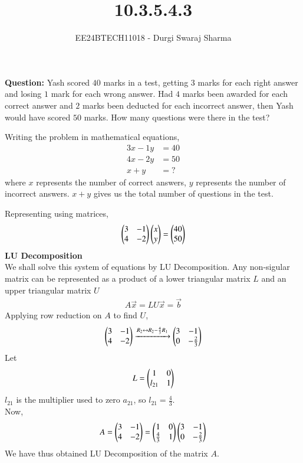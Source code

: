 \documentclass[journal]{IEEEtran}
\begin{document}

\vspace{3cm}

\title{10.3.5.4.3}
\author{EE24BTECH11018 - Durgi Swaraj Sharma}
{\let\newpage\relax\maketitle}
\textbf{Question:}
Yash scored $40$ marks in a test, getting $3$ marks for each right answer and losing $1$ mark for each wrong answer. Had $4$ marks been awarded for each correct answer and $2$ marks been deducted for each incorrect answer, then Yash would have scored $50$ marks. How many questions were there in the test?

\solution 

Writing the problem in mathematical equations,
\begin{align}
  3x-1y&=40\\
  4x-2y&=50\\
  x+y&=?
\end{align}
where $x$ represents the number of correct answers, $y$ represents the number of incorrect answers. $x+y$ gives us the total number of questions in the test. 

Representing using matrices,
\begin{align}
    \begin{pmatrix}
        3 & -1\\
        4 & -2
    \end{pmatrix} \begin{pmatrix}x \\ y\end{pmatrix}= \begin{pmatrix} 40 \\ 50\end{pmatrix}
\end{align}
\textbf{LU Decomposition}\\
We shall solve this system of equations by LU Decomposition. Any non-sigular matrix can be represented as a product of a lower triangular matrix $L$ and an upper triangular matrix $U$
\begin{align}
    A\vec{x} = LU\vec{x} = \vec{b}
\end{align}
Applying row reduction on $A$ to find $U$,
\begin{align}
  \begin{pmatrix}3 & -1\\ 4 & -2\end{pmatrix} \xrightarrow{R_2 \leftrightarrow R_2 - \frac{4}{3}R_1} \begin{pmatrix}3 & -1 \\ 0 & -\frac{2}{3}\end{pmatrix}
\end{align}
Let 
\begin{align}
    L = \begin{pmatrix}1 & 0\\ l_{21} & 1\end{pmatrix}
\end{align}
$l_{21}$ is the multiplier used to zero $a_{21}$, so $l_{21} = \frac{4}{3}$.\\
Now,
\begin{align}
  A = \begin{pmatrix}3 & -1 \\ 4 & -2\end{pmatrix} = \begin{pmatrix}1 & 0 \\ \frac{4}{3} & 1\end{pmatrix}\begin{pmatrix}3 & -1 \\ 0 & -\frac{2}{3}\end{pmatrix}
\end{align}
We have thus obtained LU Decomposition of the matrix $A$. 
\end{document}
